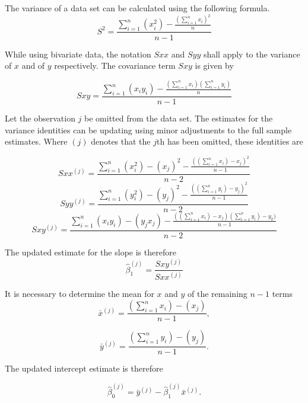 \documentclass[12pt, a4paper]{article}
\begin{document}
The variance of a data set can be calculated using the following formula.
\begin{equation}
S^{2}=\frac{\sum_{i=1}^{n}(x_{i}^{2})-\frac{(\sum_{i=1}^{n}x_{i})^{2}}{n}}{n-1}
\end{equation}

While using bivariate data, the notation $Sxx$ and $Syy$ shall apply to the variance of $x$ and of $y$ respectively. The covariance term $Sxy$ is given by

\begin{equation}
Sxy=\frac{\sum_{i=1}^{n}(x_{i}y_{i})-\frac{(\sum_{i=1}^{n}x_{i})(\sum_{i=1}^{n}y_{i})}{n}}{n-1}
\end{equation}

Let the observation $j$ be omitted from the data set. The estimates for the variance identities can be updating using minor adjustments to the full sample estimates. Where $(j)$ denotes that the $j$th has been omitted, these identities are

\begin{equation}
Sxx^{(j)}=\frac{\sum_{i=1}^{n}(x_{i}^{2})-(x_{j})^{2}-\frac{((\sum_{i=1}^{n}x_{i})-x_{j})^{2}}{n-1}}{n-2}
\end{equation}
\begin{equation}
Syy^{(j)}=\frac{\sum_{i=1}^{n}(y_{i}^{2})-(y_{j})^{2}-\frac{((\sum_{i=1}^{n}y_{i})-y_{j})^{2}}{n-1}}{n-2}
\end{equation}
\begin{equation}
Sxy^{(j)}=\frac{\sum_{i=1}^{n}(x_{i}y_{i})-(y_{j}x_{j})-\frac{((\sum_{i=1}^{n}x_{i})-x_{j})(\sum_{i=1}^{n}y_{i})-y_{k})}{n-1}}{n-2}
\end{equation}

The updated estimate for the slope is therefore
\begin{equation}
\hat{\beta}_{1}^{(j)}=\frac{Sxy^{(j)}}{Sxx^{(j)}}
\end{equation}

It is necessary to determine the mean for $x$ and $y$ of the
remaining $n-1$ terms
\begin{equation}
\bar{x}^{(j)}=\frac{(\sum_{i=1}^{n}x_{i})-(x_{j})}{n-1},
\end{equation}

\begin{equation}
\bar{y}^{(j)}=\frac{(\sum_{i=1}^{n}y_{i})-(y_{j})}{n-1}.
\end{equation}

The updated intercept estimate is therefore

\begin{equation}
\hat{\beta}_{0}^{(j)}=\bar{y}^{(j)}-\hat{\beta}_{1}^{(j)}\bar{x}^{(j)}.
\end{equation}
\end{document}
